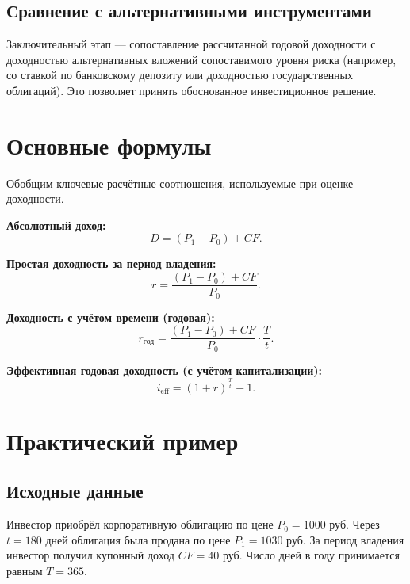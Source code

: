 \documentclass[14pt, a4paper]{extarticle}
\begin{document}
\subsection{Сравнение с альтернативными инструментами}

Заключительный этап — сопоставление рассчитанной годовой доходности с
доходностью альтернативных вложений сопоставимого уровня риска (например, со
ставкой по банковскому депозиту или доходностью государственных облигаций). Это
позволяет принять обоснованное инвестиционное решение.

\section{Основные формулы}

Обобщим ключевые расчётные соотношения, используемые при оценке доходности.

\textbf{Абсолютный доход:}
\begin{equation}
  D = (P_1 - P_0) + CF.
\end{equation}

\textbf{Простая доходность за период владения:}
\begin{equation}
  r = \frac{(P_1 - P_0) + CF}{P_0}.
\end{equation}

\textbf{Доходность с учётом времени (годовая):}
\begin{equation}
  r_{\text{год}} = \frac{(P_1 - P_0) + CF}{P_0} \cdot \frac{T}{t}.
\end{equation}

\textbf{Эффективная годовая доходность (с учётом капитализации):}
\begin{equation}
  i_{\text{eff}} = \left(1 + r\right)^{\frac{T}{t}} - 1.
\end{equation}

\section{Практический пример}

\subsection{Исходные данные}

Инвестор приобрёл корпоративную облигацию по цене $P_0 = 1000$ руб. Через
$t = 180$ дней облигация была продана по цене $P_1 = 1030$ руб. За период
владения инвестор получил купонный доход $CF = 40$ руб. Число дней в году
принимается равным $T = 365$.
\end{document}
